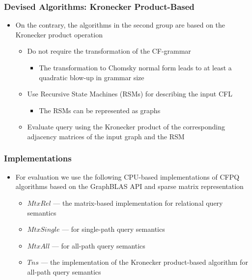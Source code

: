 \documentclass[xcolor=table,aspectratio=169]{beamer}
\begin{document}
\begin{frame}[fragile] \frametitle{Devised Algorithms: Kronecker Product-Based}
	\begin{itemize}
		\item On the contrary, the algorithms in the second group are based on the Kronecker product operation
		\begin{itemize}
			\item Do not require the transformation of the CF-grammar
			\begin{itemize}
				\item The transformation to Chomsky normal form leads to at least a quadratic blow-up in grammar	size
			\end{itemize}
			\item Use Recursive State Machines (RSMs) for describing the input CFL
			\begin{itemize}
				\item The RSMs can be represented as graphs
			\end{itemize}
			\item Evaluate query using the Kronecker product of the corresponding adjacency matrices of the input graph and the RSM
		\end{itemize}
	\end{itemize}
\end{frame}

\begin{frame}[fragile] \frametitle{Implementations}

\begin{itemize}
	\item For evaluation we use the following CPU-based implementations of CFPQ algorithms based on the GraphBLAS API and sparse matrix representation
	\begin{itemize}
		\item \textbf{$MtxRel$} --- the matrix-based implementation for  relational query semantics
		\item \textbf{$MtxSingle$} --- for  single-path query semantics
		\item \textbf{$MtxAll$} --- for all-path query semantics
		\item \textbf{$Tns$} --- the implementation of the Kronecker product-based algorithm for all-path query semantics
		
	\end{itemize}
\end{itemize}
\end{frame}
\end{document}
